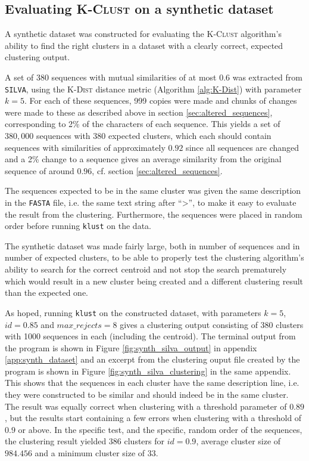 \subsection{Evaluating \textsc{K-Clust} on a synthetic dataset}
\label{sec:synth_dataset}

A synthetic dataset was constructed for evaluating the \textsc{K-Clust}
algorithm's ability to find the right clusters in a dataset with a clearly
correct, expected clustering output.

A set of 380 sequences with mutual similarities of at most 0.6 was extracted
from \texttt{SILVA}, using the \textsc{K-Dist} distance metric (Algorithm
\ref{alg:K-Dist}) with parameter $k=5$. For each of these sequences, 999 copies
were made and chunks of changes were made to these as described above in
section \ref{sec:altered_sequences}, corresponding to 2\% of the characters of
each sequence. This yields a set of $380,000$ sequences with 380 expected
clusters, which each should contain sequences with similarities of
approximately $0.92$ since all sequences are changed and a 2\% change to a
sequence gives an average similarity from the original sequence of around
$0.96$, cf. section \ref{sec:altered_sequences}.

The sequences expected to be in the same cluster was given the same description
in the \texttt{FASTA} file, i.e. the same text string after ``>'', to make it
easy to evaluate the result from the clustering. Furthermore, the sequences
were placed in random order before running \texttt{klust} on the data.

The synthetic dataset was made fairly large, both in number of sequences and in
number of expected clusters, to be able to properly test the clustering
algorithm's ability to search for the correct centroid and not stop the search
prematurely which would result in a new cluster being created and a different
clustering result than the expected one.

As hoped, running \texttt{klust} on the constructed dataset, with parameters
$k=5$, $id=0.85$ and $max\_rejects=8$ gives a clustering output consisting of
380 clusters with 1000 sequences in each (including the centroid). The terminal
output from the program is shown in Figure \ref{fig:synth_silva_output} in
appendix \ref{app:synth_dataset} and an excerpt from the clustering ouput file
created by the program is shown in Figure \ref{fig:synth_silva_clustering} in
the same appendix. This shows that the sequences in each cluster have the same
description line, i.e. they were constructed to be similar and should indeed be
in the same cluster. The result was equally correct when clustering with a
threshold parameter of $0.89$, but the results start containing a few errors
when clustering with a threshold of $0.9$ or above. In the specific test, and
the specific, random order of the sequences, the clustering result yielded 386
clusters for $id=0.9$, average cluster size of $984.456$ and a minimum cluster
size of $33$.

